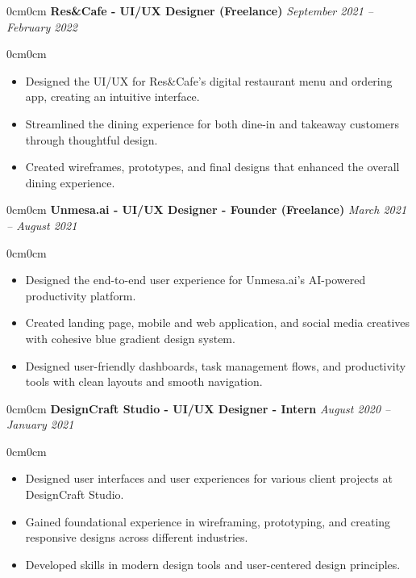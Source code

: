 \documentclass[10pt, letterpaper]{article}
\newenvironment{highlights}{\begin{itemize}[topsep=0.10 cm, parsep=0.10 cm, partopsep=0pt, itemsep=0pt, leftmargin=10pt]}{\end{itemize}}
\newenvironment{onecolentry}{\begin{adjustwidth}{0cm}{0cm}}{\end{adjustwidth}}
\begin{document}
\vspace{0.2 cm}
\begin{onecolentry}
    \textbf{Res\&Cafe - UI/UX Designer (Freelance)} \hfill \textit{September 2021 -- February 2022}
\end{onecolentry}
\vspace{0.2 cm}
\begin{onecolentry}
    \begin{highlights}
        \item Designed the UI/UX for Res\&Cafe's digital restaurant menu and ordering app, creating an intuitive interface.
        \item Streamlined the dining experience for both dine-in and takeaway customers through thoughtful design.
        \item Created wireframes, prototypes, and final designs that enhanced the overall dining experience.
    \end{highlights}
\end{onecolentry}

\vspace{0.2 cm}
\begin{onecolentry}
    \textbf{Unmesa.ai - UI/UX Designer - Founder (Freelance)} \hfill \textit{March 2021 -- August 2021}
\end{onecolentry}
\vspace{0.2 cm}
\begin{onecolentry}
    \begin{highlights}
        \item Designed the end-to-end user experience for Unmesa.ai's AI-powered productivity platform.
        \item Created landing page, mobile and web application, and social media creatives with cohesive blue gradient design system.
        \item Designed user-friendly dashboards, task management flows, and productivity tools with clean layouts and smooth navigation.
    \end{highlights}
\end{onecolentry}

\vspace{0.2 cm}
\begin{onecolentry}
    \textbf{DesignCraft Studio - UI/UX Designer - Intern} \hfill \textit{August 2020 -- January 2021}
\end{onecolentry}
\vspace{0.2 cm}
\begin{onecolentry}
    \begin{highlights}
        \item Designed user interfaces and user experiences for various client projects at DesignCraft Studio.
        \item Gained foundational experience in wireframing, prototyping, and creating responsive designs across different industries.
        \item Developed skills in modern design tools and user-centered design principles.
    \end{highlights}
\end{onecolentry}
\end{document}
